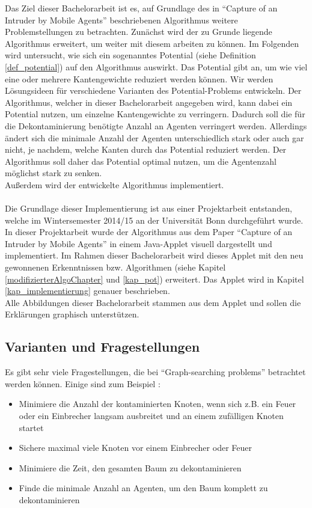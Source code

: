 Das Ziel dieser Bachelorarbeit ist es, auf Grundlage des in "`Capture of an Intruder by Mobile Agents"' \cite{cima_paper} beschriebenen Algorithmus weitere Problemstellungen zu betrachten. Zunächst wird der zu Grunde liegende Algorithmus erweitert, um weiter mit diesem arbeiten zu können. Im Folgenden wird untersucht, wie sich ein sogenanntes Potential (siehe Definition \ref{def_potential}) auf den Algorithmus auswirkt. Das Potential gibt an, um wie viel eine oder mehrere Kantengewichte reduziert werden können. Wir werden Lösungsideen für verschiedene Varianten des Potential-Problems entwickeln. Der Algorithmus, welcher in dieser Bachelorarbeit angegeben wird, kann dabei ein Potential nutzen, um einzelne Kantengewichte zu verringern. Dadurch soll die für die Dekontaminierung benötigte Anzahl an Agenten verringert werden. Allerdings ändert sich die minimale Anzahl der Agenten unterschiedlich stark oder auch gar nicht, je nachdem, welche Kanten durch das Potential reduziert werden. Der Algorithmus soll daher das Potential optimal nutzen, um die Agentenzahl möglichst stark zu senken.\\
Außerdem wird der entwickelte Algorithmus implementiert.
\\
\\
Die Grundlage dieser Implementierung ist aus einer Projektarbeit entstanden, welche im Wintersemester 2014/15 an der Universität Bonn durchgeführt wurde.
In dieser Projektarbeit wurde der Algorithmus aus dem Paper "`Capture of an Intruder by Mobile Agents"' \cite{cima_paper} in einem Java-Applet visuell dargestellt und implementiert. Im Rahmen dieser Bachelorarbeit wird dieses Applet mit den neu gewonnenen Erkenntnissen bzw. Algorithmen (siehe Kapitel \ref{modifizierterAlgoChapter} und \ref{kap_pot}) erweitert. Das Applet wird in Kapitel \ref{kap_implementierung} genauer beschrieben.\\
Alle Abbildungen dieser Bachelorarbeit stammen aus dem Applet und sollen die Erklärungen graphisch unterstützen.



\subsection{Varianten und Fragestellungen}


Es gibt sehr viele Fragestellungen, die bei "`Graph-searching problems"' betrachtet werden können. Einige sind zum Beispiel \cite{firefighterproblem_paper}:
\begin{itemize}
	\item Minimiere die Anzahl der kontaminierten Knoten, wenn sich z.B. ein Feuer oder ein Einbrecher langsam ausbreitet und an einem zufälligen Knoten startet
	\item Sichere maximal viele Knoten vor einem Einbrecher oder Feuer
	\item Minimiere die Zeit, den gesamten Baum zu dekontaminieren
	\item Finde die minimale Anzahl an  Agenten, um den Baum komplett zu dekontaminieren
\end{itemize}

